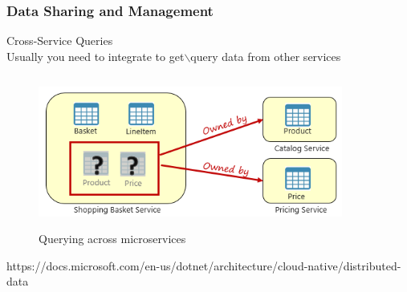 \documentclass{beamer}
\begin{document}
	\begin{frame}
		\frametitle{Data Sharing and Management}
			Cross-Service Queries \\
			\vspace{1mm}
			\hspace{3mm} \scriptsize {Usually you need to integrate to get$\backslash$query data from other services}
			\begin{figure}[h]
				\includegraphics[width=100mm,height= 50mm, scale=1]{img/csq.png}
				\caption{Querying across microservices}
			\end{figure}
			\tiny{https://docs.microsoft.com/en-us/dotnet/architecture/cloud-native/distributed-data}	
			\vspace{100mm}
	\end{frame}
\end{document}
